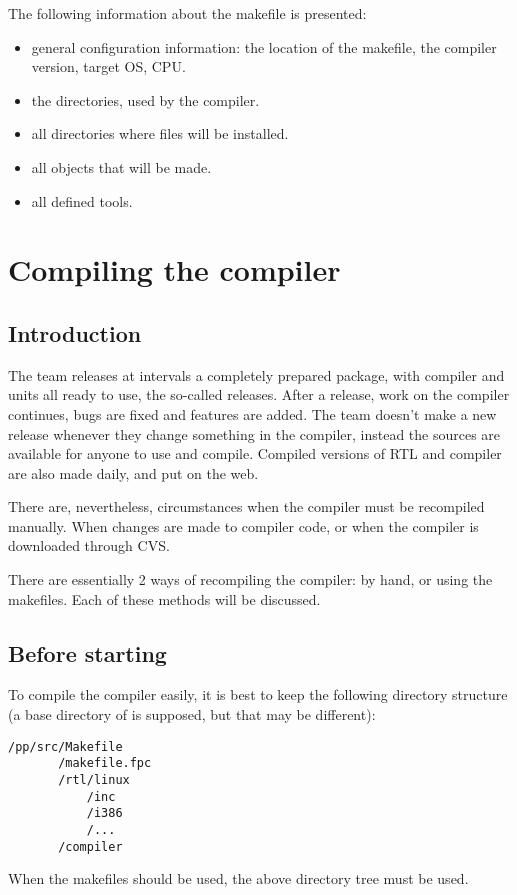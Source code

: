 {The following information about the makefile is presented:
\begin{itemize}
\item general configuration information: the location of
the makefile, the compiler version, target OS, CPU.
\item the directories, used by the compiler.
\item all directories where files will be installed.
\item all objects that will be made.
\item all defined tools.
\end{itemize}


\chapter{Compiling the compiler}
\label{ch:AppF}

\section{Introduction}

The \fpc team releases at intervals a completely prepared package, with
compiler and units all ready to use, the so-called releases.  After a
release, work on the compiler continues, bugs are fixed and features are
added. The \fpc team doesn't make a new release whenever they change
something in the compiler, instead the sources are available for anyone to
use and compile. Compiled versions of RTL and compiler are also made daily,
and put on the web.

There are, nevertheless, circumstances when the compiler must be recompiled
manually. When changes are made to compiler code, or when the compiler is
downloaded through CVS.

There are essentially 2 ways of recompiling the compiler: by hand, or using
the makefiles. Each of these methods will be discussed.

\section{Before starting}

To compile the compiler easily, it is best to keep the following directory
structure (a base directory of  is supposed, but that may be
different):
\begin{verbatim}
/pp/src/Makefile
       /makefile.fpc
       /rtl/linux
           /inc
           /i386
           /...
       /compiler
\end{verbatim}
When the makefiles should be used, the above directory tree must be used.

}
